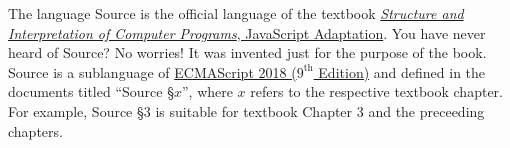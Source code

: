 The language Source is the official language of the textbook
\href{https://sicp.comp.nus.edu.sg}{\color{DarkBlue}\emph{Structure and Interpretation
of Computer Programs}, JavaScript Adaptation}.
You have never heard of Source? No worries! It was invented
just for the purpose of the book. Source is a sublanguage of 
\href{http://www.ecma-international.org/publications/files/ECMA-ST/Ecma-262.pdf}{\color{DarkBlue}
ECMAScript 2018 ($9^{\textrm{th}}$ Edition)} 
and defined in the documents titled ``Source \S $x$'', where $x$ refers to the
respective textbook chapter. For example, Source \S 3 is suitable for textbook Chapter 3
and the preceeding chapters.
